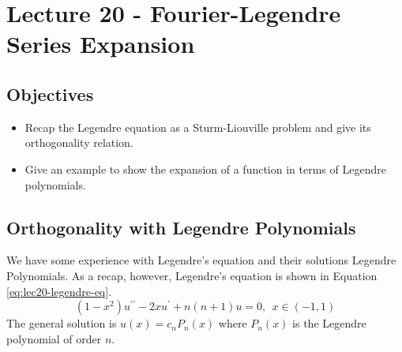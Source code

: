 \chapter{Lecture 20 - Fourier-Legendre Series Expansion}
\label{ch:lec20}
\section{Objectives}
\begin{itemize}
\item Recap the Legendre equation as a Sturm-Liouville problem and give its orthogonality relation.
\item Give an example to show the expansion of a function in terms of Legendre polynomials.
\end{itemize}
\setcounter{lstannotation}{0} %
\section{Orthogonality with Legendre Polynomials}
We have some experience with Legendre's equation and their solutions Legendre Polynomials.  As a recap, however, Legendre's equation is shown in Equation \ref{eq:lec20-legendre-eq}.
\begin{equation}
\left(1-x^2\right)u^{\prime \prime} - 2xu^{\prime} + n(n+1)u = 0, \ \ x \in (-1,1)
\label{eq:lec20-legendre-eq}
\end{equation}
The general solution is $u(x) = c_nP_n(x)$ where $P_n(x)$ is the Legendre polynomial of order $n$.  

